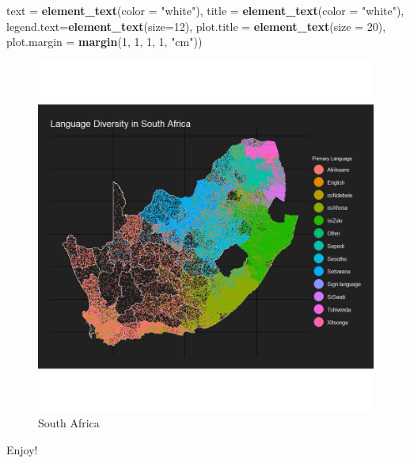 \documentclass[]{article}
\newenvironment{Shaded}{\begin{snugshade}}{\end{snugshade}}
\newcommand{\KeywordTok}[1]{\textcolor[rgb]{0.13,0.29,0.53}{\textbf{#1}}}
\newcommand{\DataTypeTok}[1]{\textcolor[rgb]{0.13,0.29,0.53}{#1}}
\newcommand{\DecValTok}[1]{\textcolor[rgb]{0.00,0.00,0.81}{#1}}
\newcommand{\StringTok}[1]{\textcolor[rgb]{0.31,0.60,0.02}{#1}}
\newcommand{\NormalTok}[1]{#1}
\begin{document}
\begin{Shaded}
\begin{Highlighting}[]
        \DataTypeTok{text =}  \KeywordTok{element_text}\NormalTok{(}\DataTypeTok{color =} \StringTok{"white"}\NormalTok{),}
        \DataTypeTok{title =}  \KeywordTok{element_text}\NormalTok{(}\DataTypeTok{color =} \StringTok{"white"}\NormalTok{),}
        \DataTypeTok{legend.text=}\KeywordTok{element_text}\NormalTok{(}\DataTypeTok{size=}\DecValTok{12}\NormalTok{),}
        \DataTypeTok{plot.title =} \KeywordTok{element_text}\NormalTok{(}\DataTypeTok{size =} \DecValTok{20}\NormalTok{),}
        \DataTypeTok{plot.margin =} \KeywordTok{margin}\NormalTok{(}\DecValTok{1}\NormalTok{, }\DecValTok{1}\NormalTok{, }\DecValTok{1}\NormalTok{, }\DecValTok{1}\NormalTok{, }\StringTok{"cm"}\NormalTok{))}
\end{Highlighting}
\end{Shaded}

\begin{figure}
\centering
\includegraphics{../../static/img/south_africa.png}
\caption{South Africa}
\end{figure}

Enjoy!
\end{document}
